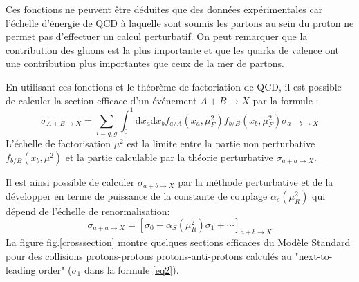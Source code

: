 Ces fonctions ne peuvent être déduites que des données expérimentales car l'échelle d'énergie de QCD à laquelle sont soumis les partons au sein du proton ne permet pas d'effectuer un calcul perturbatif. On peut remarquer que la contribution des gluons est la plus importante et que les quarks de valence ont une contribution plus importantes que ceux de la mer de partons.

En utilisant ces fonctions et le théorème de factoriation de QCD, il est possible de calculer la section efficace d'un événement $A+B\rightarrow X$ par la formule :
\begin{equation}
\sigma_{A+B\rightarrow X}=\sum_{i=q,g}\int_{0}^{1} \mathrm{d}x_{a}\mathrm{d}x_{b}f_{a/A}(x_{a},\mu_{F}^{2})f_{b/B}(x_{b},\mu_{F}^{2})\sigma{_{a+b\rightarrow X}}
\end{equation}
L'échelle de factorisation $\mu^{2}$ est la limite entre la partie non perturbative $f_{b/B}(x_{b},\mu^{2})$ et la partie calculable par la théorie perturbative $\sigma{_{a+a\rightarrow X}}$.

Il est ainsi possible de calculer $\sigma{_{a+b\rightarrow X}}$ par la méthode perturbative et de la développer en terme de puissance de la constante de couplage $\alpha_{s}\left(\mu_{R}^{2}\right)$ qui dépend de l'échelle de renormalisation:
\begin{equation}
\sigma_{a+a\rightarrow X}=\left[\sigma_{0}+\alpha_{S}\left(\mu_{R}^{2}\right)\sigma_{1}+\cdots\right]_{a+b\rightarrow X}
\label{eq2}
\end{equation}
La figure fig.\ref{crosssection} montre quelques sections efficaces du Modèle Standard pour des collisions protons-protons protons-anti-protons calculés au "next-to-leading order" ($\sigma_{1}$ dans la formule \ref{eq2}).

